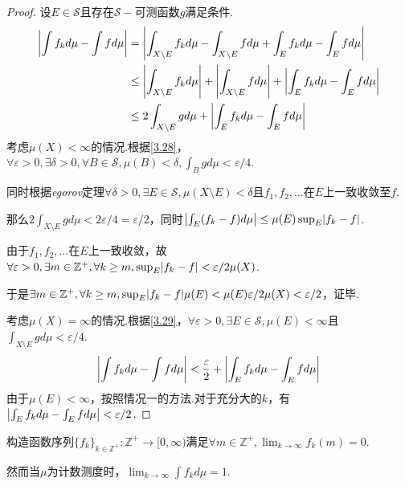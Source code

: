 \begin{proof}
    设\(E \in \mathcal{S}\)且存在\(\mathcal{S}-\)可测函数\(g\)满足条件.
    \begin{align*}
        \abs*{\int f_k d\mu-\int f d\mu}&=\abs*{\int_{X \setminus E} f_k d\mu-\int_{X \setminus E} f d\mu+\int_E f_k d\mu-\int_E f d\mu} \\
        &\leq \abs*{\int_{X \setminus E} f_k d\mu}+\abs*{\int_{X \setminus E} f d\mu}+\abs*{\int_E f_k d\mu-\int_E f d\mu} \\
        &\leq 2\int_{X \setminus E} g d\mu+\abs*{\int_E f_k d\mu-\int_E f d\mu}
    \end{align*}
    考虑\(\mu(X)<\infty\)的情况.根据\cref{3.28}，\(\forall \varepsilon>0, \exists \delta>0, \forall B \in \mathcal{S}, \mu(B)<\delta, \int_B g d\mu<\varepsilon/4\).

    同时根据\textit{egorov}定理\(\forall \delta>0, \exists E \in \mathcal{S}, \mu(X \setminus E)<\delta\)且\(f_1, f_2, \dots\)在\(E\)上一致收敛至\(f\).

    那么\(2\int_{X \setminus E} g d\mu<2\varepsilon/4=\varepsilon/2\)，同时\(\abs*{\int_E (f_k-f) d\mu} \leq \mu(E) \sup_E\abs*{f_k-f}\).

    由于\(f_1, f_2, \dots\)在\(E\)上一致收敛，故\(\forall \varepsilon>0, \exists m \in \mathbb{Z}^+, \forall k \geq m, \sup_E \abs*{f_k-f}<\varepsilon/2\mu(X)\).

    于是\(\exists m \in \mathbb{Z}^+, \forall k \geq m, \sup_E \abs*{f_k-f} \mu(E)<\mu(E) \varepsilon/2\mu(X)<\varepsilon/2\)，证毕.

    考虑\(\mu(X)=\infty\)的情况.根据\cref{3.29}，\(\forall \varepsilon>0, \exists E \in \mathcal{S}, \mu(E)<\infty\)且\(\int_{X \setminus E} g d\mu<\varepsilon/4\).
    \begin{align*}
        \abs*{\int f_k d\mu-\int f d\mu}<\frac{\varepsilon}{2}+\abs*{\int_E f_k d\mu-\int_E f d\mu}
    \end{align*}
    由于\(\mu(E)<\infty\)，按照{\kaishu 情况一}的方法.对于充分大的\(k\)，有\(\abs*{\int_E f_k d\mu-\int_E f d\mu}<\varepsilon/2\).
\end{proof}

\begin{problem}[1]\label{3.B.1}
    构造函数序列\(\{f_k\}_{k \in \mathbb{Z}^+}: \mathbb{Z}^+ \to [0,\infty)\)满足\(\forall m \in \mathbb{Z}^+, \lim_{k \to \infty}f_k(m)=0\).

    然而当\(\mu\)为计数测度时，\(\lim_{k \to \infty} \int f_k d\mu=1\).
\end{problem}

